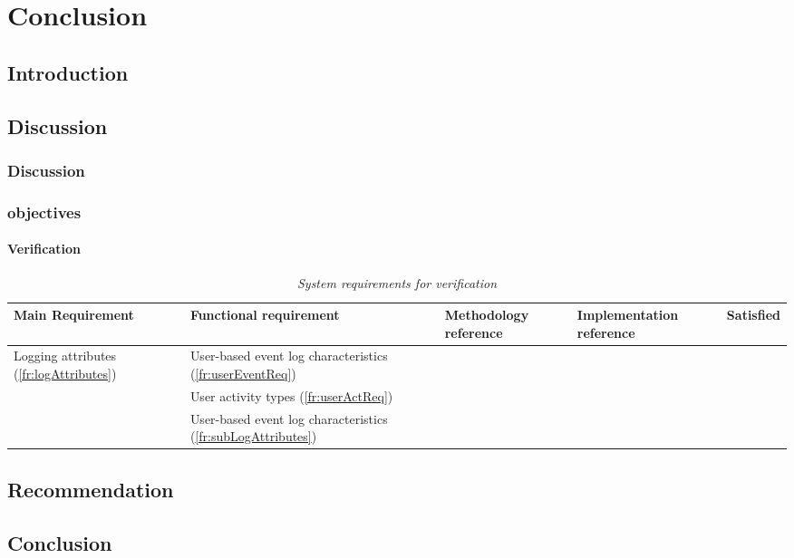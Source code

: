 \chapter{Conclusion}
\label{chap:4}

\section{Introduction}
\section{Discussion}

\subsection{Discussion}

\subsection{objectives}

\begin{landscape}
	\subsubsection{Verification}

	\begin{table}[!htb]
		\centering
		\small
		\caption[System requirements for verification]
		{\textit{System requirements for verification}}
		\label{tbl:ch2_verification}
		\begin{tabularx}{\linewidth}{|l|X|X|X|c|}
			\hline \textbf{Main Requirement} & \textbf{Functional requirement} & \textbf{Methodology reference} & \textbf{Implementation reference} & \textbf{Satisfied} \\ 
			\hline \multirow{3}{*}{Logging attributes (\ref{fr:logAttributes})} & User-based event log characteristics (\ref{fr:userEventReq}) & \Cref{sec:ch2_requirementsOfUAT} &  & \cmark \\
				& User activity types (\ref{fr:userActReq}) & \Cref{sec:ch2_userActivityTypes} &  & \cmark \\ \cline{2-5}
				& User-based event log characteristics (\ref{fr:subLogAttributes}) & \Cref{sec:ch2_logAttributesRequirements} & \Cref{sec:ch3_logAtrributes} & \cmark \\ \cline{2-5}\cline{2-5}
			\hline
		\end{tabularx}
	\end{table}
\end{landscape}

\section{Recommendation}

\section{Conclusion}